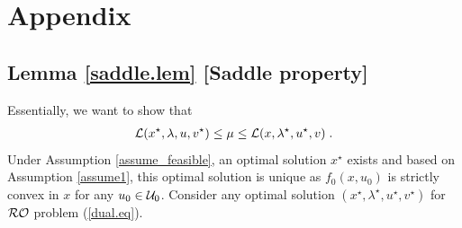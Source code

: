 \documentclass[journal,twoside,web]{ieeecolor}
\begin{document}
\section{Appendix} \label{section_appendix}

\subsection{Lemma \ref{saddle.lem} [Saddle property]}
Essentially, we want to show that
\begin{align*}
{\cal L}(x^\star,\lambda,u,v^\star)\leq \mu \leq {\cal L}(x,\lambda^\star,u^\star,v)\;.
\end{align*}
Under Assumption \ref{assume_feasible}, an optimal solution $x^\star$ exists and based on Assumption \ref{assume1}, this optimal solution is unique as $f_0(x,u_0)$ is strictly convex in $x$ for any $u_0 \in{\cal U}_0$. Consider any optimal solution $(x^\star,\lambda^\star,u^\star,v^\star)$ for ${\cal RO}$ problem (\ref{dual.eq}).
\end{document}
